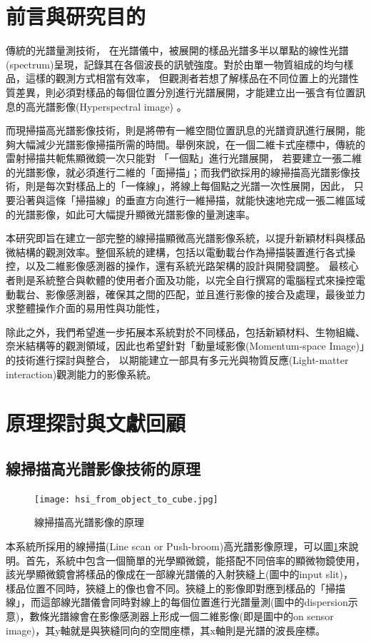 \documentclass[12pt]{article}
\begin{document}
\section{前言與研究目的}
傳統的光譜量測技術，
在光譜儀中，被展開的樣品光譜多半以單點的線性光譜(spectrum)呈現，記錄其在各個波長的訊號強度。對於由單一物質組成的均勻樣品，這樣的觀測方式相當有效率，
但觀測者若想了解樣品在不同位置上的光譜性質差異，則必須對樣品的每個位置分別進行光譜展開，才能建立出一張含有位置訊息的高光譜影像(Hyperspectral image)
。

而現掃描高光譜影像技術，則是將帶有一維空間位置訊息的光譜資訊進行展開，能夠大幅減少光譜影像掃描所需的時間。舉例來說，在一個二維卡式座標中，傳統的雷射掃描共軛焦顯微鏡一次只能對
「一個點」進行光譜展開，
若要建立一張二維的光譜影像，就必須進行二維的「面掃描」；而我們欲採用的線掃描高光譜影像技術，則是每次對樣品上的「一條線」，將線上每個點之光譜一次性展開，因此，
只要沿著與這條「掃描線」的垂直方向進行一維掃描，就能快速地完成一張二維區域的光譜影像，如此可大幅提升顯微光譜影像的量測速率。

本研究即旨在建立一部完整的線掃描顯微高光譜影像系統，以提升新穎材料與樣品微結構的觀測效率。整個系統的建構，包括以電動載台作為掃描裝置進行各式操控，以及二維影像感測器的操作，還有系統光路架構的設計與開發調整。
最核心者則是系統整合與軟體的使用者介面及功能，以完全自行撰寫的電腦程式來操控電動載台、影像感測器，確保其之間的匹配，並且進行影像的接合及處理，最後並力求整體操作介面的易用性與功能性，

除此之外，我們希望進一步拓展本系統對於不同樣品，包括新穎材料、生物組織、奈米結構等的觀測領域，因此也希望針對「動量域影像(Momentum-space Image)」的技術進行探討與整合，
以期能建立一部具有多元光與物質反應(Light-matter interaction)觀測能力的影像系統。

\section{原理探討與文獻回顧}
\subsection{線掃描高光譜影像技術的原理}
\begin{figure}[h]
    \centering
    \texttt{[image: hsi\_from\_object\_to\_cube.jpg]}
    \caption{線掃描高光譜影像的原理}
    \label{fromObjecttoCube}
\end{figure}
本系統所採用的線掃描(Line scan or Push-broom)高光譜影像原理，可以圖\ref{fromObjecttoCube}來說明。首先，系統中包含一個簡單的光學顯微鏡，能搭配不同倍率的顯微物鏡使用，該光學顯微鏡會將樣品的像成在一部線光譜儀的入射狹縫上(圖中的input slit)，
樣品位置不同時，狹縫上的像也會不同。狹縫上的影像即對應到樣品的「掃描線」，而這部線光譜儀會同時對線上的每個位置進行光譜量測(圖中的dispersion示意)，數條光譜線會在影像感測器上形成一個二維影像(即是圖中的on sensor image)，其y軸就是與狹縫同向的空間座標，其x軸則是光譜的波長座標。
\end{document}
